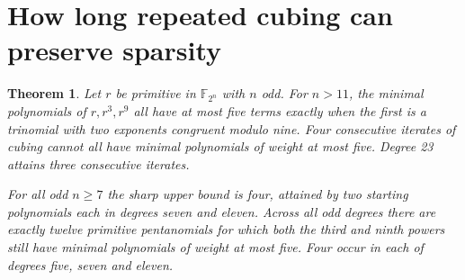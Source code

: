 \documentclass[11pt]{article}
\newtheorem{theorem}{Theorem}
\begin{document}
\section{How long repeated cubing can preserve sparsity}
\label{sec:cubing-chains}
\begin{theorem}\label{thm:cubing-chains}
Let \(r\) be primitive in \(\mathbb F_{2^n}\) with \(n\) odd.
For \(n>11\), the minimal polynomials of \(r,r^3,r^9\) all have at
most five terms exactly when the first is a trinomial with two
exponents congruent modulo nine. Four consecutive iterates of cubing
cannot all have minimal polynomials of weight at most five.
Degree 23 attains three consecutive iterates.

For all odd \(n\ge7\) the sharp upper bound is four, attained by two
starting polynomials each in degrees seven and eleven. Across all odd
degrees there are exactly twelve primitive pentanomials for which both
the third and ninth powers still have minimal polynomials of weight at
most five. Four occur in each of degrees five, seven and eleven.
\end{theorem}
\end{document}

